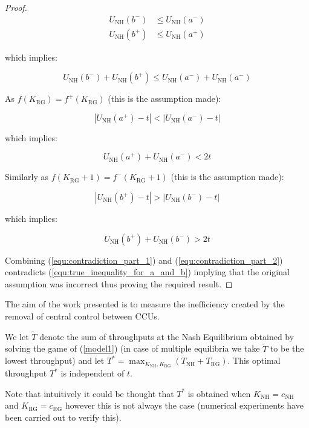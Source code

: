 \documentclass{article}
\newcommand{\NH}{\text{NH}}
\newcommand{\RG}{\text{RG}}
\begin{document}
\begin{proof}
\begin{align}
U_{\NH}(b^-)&\leq U_{\NH}(a^-)\\
U_{\NH}(b^+)&\leq U_{\NH}(a^+)
\end{align}

which implies:

\begin{equation}
U_{\NH}(b^-) +  U_{\NH}(b^+) \leq U_{\NH}(a^-) + U_{\NH}(a^-)
\label{equ:true_inequality_for_a_and_b}
\end{equation}

As \(f(K_{\RG})=f^{+}(K_{\RG})\) (this is the assumption made):

\begin{equation}
|U_{\NH}(a^+)-t|<|U_{\NH}(a^-)-t|
\end{equation}

which implies:

\begin{equation}
U_{\NH}(a^+)+U_{\NH}(a^-)<2t
\label{equ:contradiction_part_1}
\end{equation}

Similarly as \(f(K_{\RG}+1)=f^{-}(K_{\RG}+1)\) (this is the assumption made):

\begin{equation}
|U_{\NH}(b^+)-t|>|U_{\NH}(b^-)-t|
\end{equation}

which implies:

\begin{equation}
U_{\NH}(b^+)+U_{\NH}(b^-)>2t
\label{equ:contradiction_part_2}
\end{equation}

Combining (\ref{equ:contradiction_part_1}) and (\ref{equ:contradiction_part_2}) contradicts (\ref{equ:true_inequality_for_a_and_b}) implying that the original assumption was incorrect thus proving the required result.
\end{proof}

The aim of the work presented is to measure the inefficiency created by the removal of central control between CCUs.

We let $\widetilde T$ denote the sum of throughputs at the Nash Equilibrium
obtained by solving the game of (\ref{model1}) (in case of multiple equilibria
we take $\widetilde T$ to be the lowest throughput) and let $T^*=\max_{K_{\NH},
K_{\RG}}\left(T_{\NH}+T_{\RG}\right)$. This optimal throughput \(T^*\) is
independent of \(t\).

Note that intuitively it could be thought that \(T^*\) is obtained when
\(K_{\NH}=c_{\NH}\) and \(K_{\RG}=c_{\RG}\) however this is not always the case
(numerical experiments have been carried out to verify this).
\end{document}
